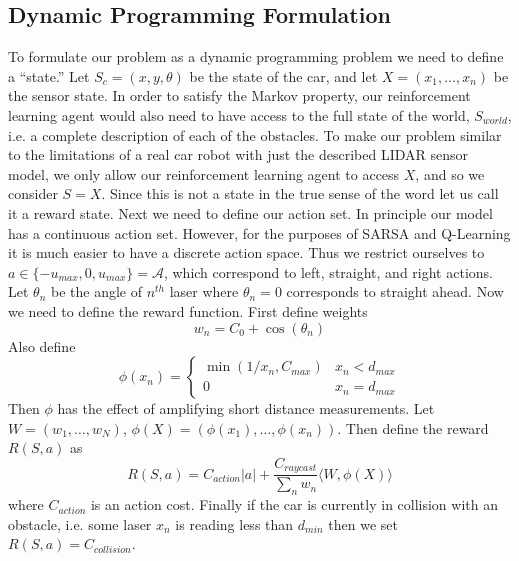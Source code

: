 \documentclass{article}
\begin{document}
\subsection{Dynamic Programming Formulation}
To formulate our problem as a dynamic programming problem we need to define a ``state.'' Let $S_c = (x,y,\theta)$ be the state of the car, and let $X  = (x_1,\ldots,x_n)$ be the sensor state. In order to satisfy the Markov property, our reinforcement learning agent would also need to have access to the full state of the world, $S_{world}$, i.e. a complete description of each of the obstacles.  To make our problem similar to the limitations of a real car robot with just the described LIDAR sensor model, we only allow our reinforcement learning agent to access $X$, and so we consider $S = X$. Since this is not a state in the true sense of the word let us call it a reward state.  Next we need to define our action set. In principle our model has a continuous action set. However, for the purposes of SARSA and Q-Learning it is much easier to have a discrete action space. Thus we restrict ourselves to $a \in \{-u_{max},0,u_{max}\} = \mathcal{A}$, which correspond to left, straight, and right actions. Let $\theta_n$ be the angle of $n^{th}$ laser where $\theta_n = 0$ corresponds to straight ahead. Now we need to define the reward function. First define weights
%
%
\begin{equation}
w_n = C_0 + \cos(\theta_n)
\end{equation}
%
%
Also define
%
%
\begin{equation}
\phi(x_n) = \begin{cases}
\min(1/x_n, C_{max}) & x_n < d_{max}\\
0 & x_n = d_{max} 
\end{cases}
\end{equation}
%
%
Then $\phi$ has the effect of amplifying short distance measurements. Let $W = (w_1,\ldots,w_N)$, $\phi(X) = (\phi(x_1),\ldots,\phi(x_n))$. Then define the reward $R(S,a)$ as
%
%
\begin{equation}
R(S,a) = C_{action} |a| + \frac{C_{raycast}}{\sum_n w_n} \langle W, \phi(X) \rangle
\end{equation}
%
%
where $C_{action}$ is an action cost. Finally if the car is currently in collision with an obstacle, i.e. some laser $x_n$ is reading less than $d_{min}$ then we set $R(S,a) = C_{collision}$.
\end{document}
